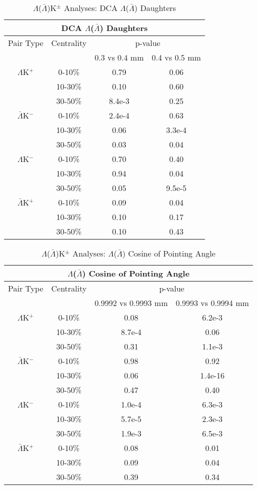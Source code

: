 \documentclass[../AnalysisNoteJBuxton.tex]{subfiles}
\begin{document}
\begin{table}
 \centering
 \begin{tabular}{|c|c|c|c|}
 \multicolumn{4}{c}{DCA $\Lambda$($\bar{\Lambda}$) Daughters} \\
  \hline
  Pair Type & Centrality & \multicolumn{2}{c|}{p-value} \\
  \cline{3-4}
   & & 0.3 vs 0.4 mm & 0.4 vs 0.5 mm \\
  \hline
  $\Lambda$K$^{+}$ & 0-10\% & 0.79 & 0.06 \\
   & 10-30\% & 0.10 & 0.60 \\
   & 30-50\% & 8.4e-3 & 0.25 \\
  \hline
  $\bar{\Lambda}$K$^{-}$ & 0-10\% & 2.4e-4 & 0.63 \\
   & 10-30\% & 0.06 & 3.3e-4 \\
   & 30-50\% & 0.03 & 0.04 \\
  \hline \hline
  $\Lambda$K$^{-}$ & 0-10\% & 0.70 & 0.40 \\
   & 10-30\% & 0.94 & 0.04 \\
   & 30-50\% & 0.05 & 9.5e-5 \\
  \hline
  $\bar{\Lambda}$K$^{+}$ & 0-10\% & 0.09 & 0.04 \\
   & 10-30\% & 0.10 & 0.17 \\
   & 30-50\% & 0.10 & 0.43 \\
  \hline
 \end{tabular}
 \caption{$\Lambda$($\bar{\Lambda}$)K$^{\pm}$ Analyses: DCA $\Lambda$($\bar{\Lambda}$) Daughters}
 \label{tab:LamDaughtersDcaLamKch}
\end{table}

\begin{table}
 \centering
 \begin{tabular}{|c|c|c|c|}
 \multicolumn{4}{c}{$\Lambda$($\bar{\Lambda}$) Cosine of Pointing Angle} \\
  \hline
  Pair Type & Centrality & \multicolumn{2}{c|}{p-value} \\
  \cline{3-4}
   & & 0.9992 vs 0.9993 mm & 0.9993 vs 0.9994 mm \\
  \hline
  $\Lambda$K$^{+}$ & 0-10\% & 0.08 & 6.2e-3 \\
   & 10-30\% & 8.7e-4 & 0.06 \\
   & 30-50\% & 0.31 & 1.1e-3 \\
  \hline
  $\bar{\Lambda}$K$^{-}$ & 0-10\% & 0.98 & 0.92 \\
   & 10-30\% & 0.06 & 1.4e-16 \\
   & 30-50\% & 0.47 & 0.40 \\
  \hline \hline
  $\Lambda$K$^{-}$ & 0-10\% & 1.0e-4 & 6.3e-3 \\
   & 10-30\% & 5.7e-5 & 2.3e-3 \\
   & 30-50\% & 1.9e-3 & 6.5e-3 \\
  \hline
  $\bar{\Lambda}$K$^{+}$ & 0-10\% & 0.08 & 0.01 \\
   & 10-30\% & 0.09 & 0.04 \\
   & 30-50\% & 0.39 & 0.34 \\
  \hline
 \end{tabular}
 \caption{$\Lambda$($\bar{\Lambda}$)K$^{\pm}$ Analyses: $\Lambda$($\bar{\Lambda}$) Cosine of Pointing Angle}
 \label{tab:LamCosPointingAngleLamKch}
\end{table}
\end{document}
